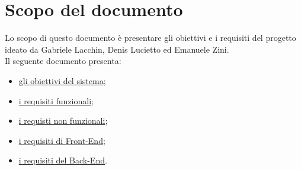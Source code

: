 \section*{Scopo del documento}
Lo scopo di questo documento è presentare gli obiettivi e i requisiti del progetto \nome ideato da Gabriele Lacchin, Denis Lucietto ed Emanuele Zini.\\
Il seguente documento presenta:
\begin{itemize}
    \item \hyperref[sec:ObiettiviProgetto]{gli obiettivi del sistema};
    \item \hyperref[sec:RequisitiFunzionali]{i requisiti funzionali};
    \item \hyperref[sec:RequisitiNonFunzionali]{i requisti non funzionali};
    \item \hyperref[sec:RequisitiFrontEnd]{i requisiti di Front-End};
    \item \hyperref[sec:RequisitiBackEnd]{i requisiti del Back-End}.
\end{itemize}